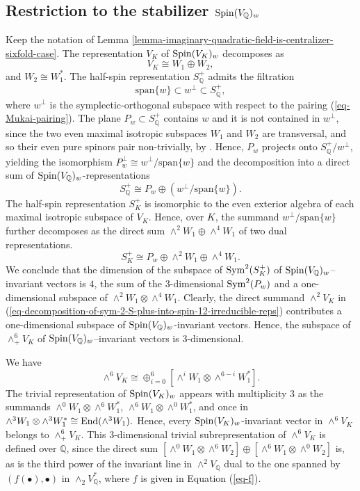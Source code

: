 \documentclass[12pt]{amsart}
\numberwithin{equation}{subsection}
\theoremstyle{plain}
\theoremstyle{definition}
\newcommand{\QQ}{{\mathbb Q}}
\newcommand{\Spin}{{\rm Spin}}
\newcommand{\Sym}{{\rm Sym}}
\newcommand{\End}{{\rm End}}
\begin{document}
{\subsection{Restriction to the stabilizer $\Spin(V_\QQ)_w$}
Keep the notation of Lemma \ref{lemma-imaginary-quadratic-field-is-centralizer-sixfold-case}.
The representation $V_K$ of $\Spin(V_K)_w$ decomposes as
\[
V_K\cong W_1\oplus W_2,
\]
and $W_2\cong W_1^*$.
The half-spin representation $S^+_\QQ$ admits the filtration 
\[
\mbox{span}\{w\}\subset w^\perp\subset S^+_\QQ, 
\]
where $w^\perp$ is the symplectic-orthogonal subspace with respect to the pairing (\ref{eq-Mukai-pairing}). The plane $P_w\subset S^+_\QQ$ contains $w$ and it is not contained in $w^\perp$, since the two even maximal isotropic subspaces $W_1$ and $W_2$ are transversal, and so their even pure spinors pair non-trivially, by \cite[III.2.4]{chevalley}.
Hence, $P_w$ projects onto $S^+_\QQ/w^\perp$, 
yielding the isomorphism $P_w^\perp\cong w^\perp/\mbox{span}\{w\}$ and the 
decomposition into a direct sum of  $\Spin(V_\QQ)_w$-representations
\begin{equation}
\label{eq-restriction-of-positive-half-spin-decomposes}
S^+_\QQ\cong P_w\oplus (w^\perp/\mbox{span}\{w\}).
\end{equation}
The half-spin representation $S^+_K$ is isomorphic to the even exterior algebra of each maximal isotropic subspace of $V_K$. Hence, 
over $K$, the summand $w^\perp/\mbox{span}\{w\}$ further decomposes as the direct sum $\wedge^2W_1\oplus \wedge^4 W_1$ of two dual representations.
\[
S^+_K\cong P_w\oplus \wedge^2W_1\oplus \wedge^4W_1.
\]
We conclude that the dimension of the subspace of $\Sym^2(S^+_K)$ of $\Spin(V_\QQ)_w$--invariant vectors is $4$, the sum of the $3$-dimensional $\Sym^2(P_w)$ and a one-dimensional subspace of $\wedge^2W_1\otimes \wedge^4W_1$. Clearly, the direct summand $\wedge^2V_K$ in 
(\ref{eq-decomposition-of-sym-2-S-plus-into-spin-12-irreducible-reps}) contributes a one-dimensional subspace of $\Spin(V_\QQ)_w$-invariant vectors. Hence, the subspace of $\wedge^6_+V_K$ of $\Spin(V_\QQ)_w$--invariant vectors is 
$3$-dimensional.

We have
\[
\wedge^6V_K\cong \oplus_{i=0}^6\left[\wedge^iW_1\otimes\wedge^{6-i}W_1^*\right].
\]
The trivial representation of $\Spin(V_K)_w$ appears with multiplicity $3$ as the summands
$\wedge^0W_1\otimes\wedge^6W_1^*$, 
$\wedge^6W_1\otimes\wedge^0W_1^*$, and once in
$\wedge^3W_1\otimes\wedge^3W_1^*\cong\End(\wedge^3W_1).$
Hence, every $\Spin(V_K)_w$-invariant vector in $\wedge^6V_K$ belongs to $\wedge^6_+V_K$.
This $3$-dimensional trivial subrepresentation of $\wedge^6V_K$ is defined over $\QQ$, since the direct sum 
$[\wedge^0W_1\otimes\wedge^6W_2]\oplus 
[\wedge^6W_1\otimes\wedge^0W_2]$ is, as is the third power of the invariant line  in $\wedge^2V_\QQ$ dual to the one spanned by $(f(\bullet),\bullet)$ in $\wedge_2V_\QQ^*$, where $f$ is given in Equation (\ref{eq-f}). 

}
\end{document}

